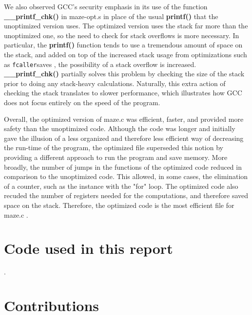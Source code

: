 \documentclass[12pt,letterpaper]{article}
\begin{document}
We also observed GCC’s security emphasis in its use of the function 
{\bf \_\_printf\_chk()} in maze-opt.s in place of the usual {\bf printf()} 
that the unoptimized version uses. The optimized version uses the 
stack far more than the unoptimized one, so the need to check for 
stack overflows is more necessary. In particular, the {\bf printf()} 
function tends to use a tremendous amount of space on the stack, and 
added on top of the increased stack usage from optimizations such as 
\verb -fcaller-saves , the possibility of a stack overflow is increased. 
{\bf \_\_printf\_chk()} partially solves this problem by  checking the size 
of the stack prior to doing any stack-heavy calculations. Naturally, 
this extra action of checking the stack translates to slower performance, 
which illustrates how GCC does not focus entirely on the speed of the program.

Overall, the optimized version of maze.c was efficient, faster, and provided 
more safety than the unoptimized code. Although the code was longer and 
initially gave the illusion of a less organized and therefore less efficient 
way of decreasing the run-time of the program, the optimized file superseded 
this notion by providing a different approach to run the program and save memory.
More broadly, the number of jumps in the functions of the optimized code reduced in comparison to the unoptimized code. This allowed, in some cases, the elimination of a counter, such as the instance with the "for" loop. The optimized code also recuded the number of registers needed for the computations, and therefore saved space on the stack. Therefore, the optimized code is the most efficient file for maze.c 
\appendix .
\appendixpage
\section{Code used in this report}

\appendix .
\section{Contributions}
\end{document}
